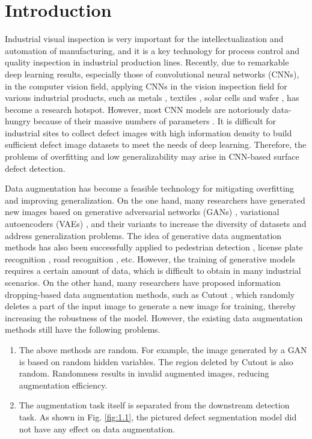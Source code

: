 \documentclass[sn-mathphys]{sn-jnl}%
\theoremstyle{thmstyleone}%
\theoremstyle{thmstyletwo}%
\theoremstyle{thmstylethree}%
\begin{document}
\section{Introduction}

\label{sec1}

Industrial visual inspection is very important for the intellectualization and automation of manufacturing, and it is a key technology for process control and quality inspection in industrial production lines. Recently, due to remarkable deep learning results, especially those of convolutional neural networks (CNNs), in the computer vision field, applying CNNs in the vision inspection field for various industrial products, such as metals \cite{hu2020an}, textiles \cite{dong2020pga}, solar cells \cite{su2021deep} and wafer \cite{kim2021wafer,cheng2021machine}, has become a research hotspot.
However, most CNN models are notoriously data-hungry because of their massive numbers of parameters \cite{chen2020gridmask}. It is difficult for industrial sites to collect defect images with high information density to build sufficient defect image datasets to meet the needs of deep learning. Therefore, the problems of overfitting and low generalizability \cite{krizhevsky2012imagenet} may arise in CNN-based surface defect detection.

Data augmentation has become a feasible technology for mitigating overfitting and improving generalization. On the one hand, many researchers have generated new images based on generative adversarial networks (GANs) \cite{goodfellow2014generative}, variational autoencoders (VAEs) \cite{kingma2013auto}, and their variants \cite{isola2017image, choi2018stargan} to increase the diversity of datasets and address generalization problems. The idea of generative data augmentation methods has also been successfully applied to pedestrian detection \cite{zheng2017unlabeled}, license plate recognition \cite{wang2017adversarial}, road recognition \cite{fan2021learning}, etc. However, the training of generative models requires a certain amount of data, which is difficult to obtain in many industrial scenarios.
On the other hand, many researchers have proposed information dropping-based data augmentation methods, such as Cutout \cite{devries2017improved}, which randomly deletes a part of the input image to generate a new image for training, thereby increasing the robustness of the model. However, the existing data augmentation methods still have the following problems.
\begin{enumerate}[1)]
\item The above methods are random. For example, the image generated by a GAN \cite{goodfellow2014generative} is based on random hidden variables. The region deleted by Cutout \cite{devries2017improved} is also random. Randomness results in invalid augmented images, reducing augmentation efficiency.
\item The augmentation task itself is separated from the downstream detection task. As shown in Fig. \ref{fig:1.1}, the pictured defect segmentation model did not have any effect on data augmentation.
\end{enumerate}
\end{document}
